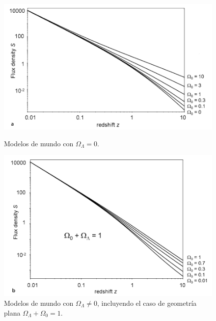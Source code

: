 \documentclass[11pt]{article}
\begin{document}
\begin{figure}[H]
        \begin{minipage}[b]{0.41\linewidth}
            \includegraphics[scale=0.40]{79a_Malcolmpp237.png}
            \caption{\footnotesize{Modelos de mundo con $\Omega_{\Lambda}=0$.}}
    \end{minipage}
        \hspace{0.9cm}
    \begin{minipage}[b]{0.36\linewidth}
            \includegraphics[scale=0.39]{79b_Malcolmpp237.png}
            
            \caption{\footnotesize{Modelos de mundo con $\Omega_{\Lambda} \neq 0$, incluyendo el caso de geometría plana $\Omega_{\Lambda} + \Omega_0 =1$. }}
    \end{minipage}
\end{figure}

\vspace{0.4cm}
    
\end{document}
